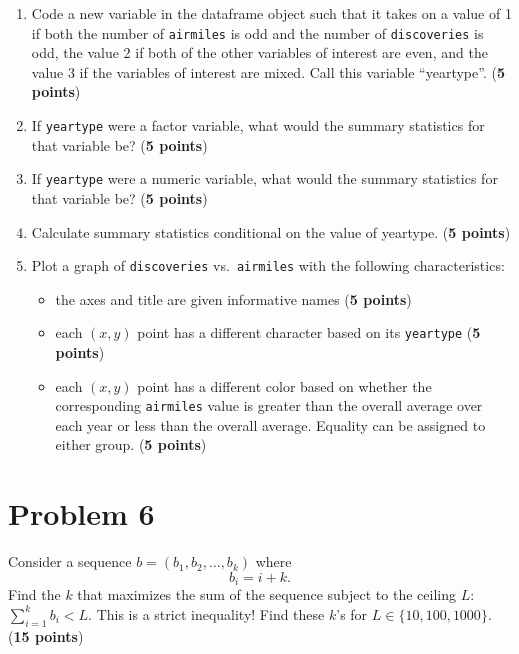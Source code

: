 \documentclass[10pt,letterpaper]{article}
\begin{document}
\begin{enumerate}
\item Code a new variable in the dataframe object such that it takes
  on a value of 1 if both the number of \texttt{airmiles} is odd and
  the number of \texttt{discoveries} is odd, the value 2 if both of
  the other variables of interest are even, and the value 3 if the
  variables of interest are mixed. Call this variable
  ``yeartype''. (\textbf{5 points})

\item If \texttt{yeartype} were a factor variable, what would the
  summary statistics for that variable be? (\textbf{5 points})

\item If \texttt{yeartype} were a numeric variable, what would the
  summary statistics for that variable be? (\textbf{5 points})

\item Calculate summary statistics conditional on the value of
  yeartype. (\textbf{5 points})

\item Plot a graph of \texttt{discoveries} vs.\ \texttt{airmiles} with
  the following characteristics:
  \begin{itemize}
  \item the axes and title are given informative names (\textbf{5 points})
  \item each $(x,y)$ point has a different character based on its \texttt{yeartype} (\textbf{5 points})
  \item each $(x,y)$ point has a different color based on whether the
    corresponding \texttt{airmiles} value is greater than the overall
    average over each year or less than the overall average. Equality
    can be assigned to either group. (\textbf{5 points})
  \end{itemize}
\end{enumerate}



\section*{Problem 6}
Consider a sequence $b = (b_1, b_2, \ldots, b_k)$ where
\[
b_i = i + k.
\]
Find the $k$ that maximizes the sum of the sequence subject to the
ceiling $L$: $\sum_{i = 1}^{k} b_i < L$. This is a strict inequality!
Find these $k$'s for $L \in \lbrace 10, 100, 1000 \rbrace$. (\textbf{15 points})




\end{document}
